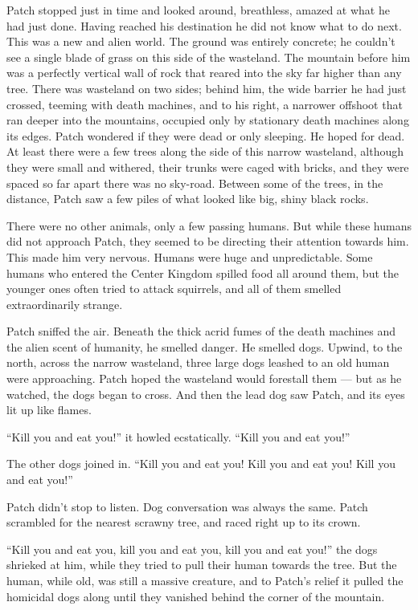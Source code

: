 \documentclass[12pt]{memoir}
\begin{document}
Patch stopped just in time and looked around, breathless, amazed at
what he had just done. Having reached his destination he did not know
what to do next. This was a new and alien world. The ground was
entirely concrete; he couldn’t see a single blade of grass on this
side of the wasteland. The mountain before him was a perfectly
vertical wall of rock that reared into the sky far higher than any
tree. There was wasteland on two sides; behind him, the wide barrier
he had just crossed, teeming with death machines, and to his right, a
narrower offshoot that ran deeper into the mountains, occupied only by
stationary death machines along its edges. Patch wondered if they were
dead or only sleeping. He hoped for dead. At least there were a few
trees along the side of this narrow wasteland, although they were
small and withered, their trunks were caged with bricks, and they were
spaced so far apart there was no sky-road. Between some of the trees,
in the distance, Patch saw a few piles of what looked like big, shiny
black rocks.

There were no other animals, only a few passing humans. But while
these humans did not approach Patch, they seemed to be directing their
attention towards him. This made him very nervous. Humans were huge
and unpredictable. Some humans who entered the Center Kingdom spilled
food all around them, but the younger ones often tried to attack
squirrels, and all of them smelled extraordinarily strange.

Patch sniffed the air. Beneath the thick acrid fumes of the death
machines and the alien scent of humanity, he smelled danger. He
smelled dogs. Upwind, to the north, across the narrow wasteland, three
large dogs leashed to an old human were approaching. Patch hoped the
wasteland would forestall them — but as he watched, the dogs began to
cross. And then the lead dog saw Patch, and its eyes lit up like
flames.

“Kill you and eat you!” it howled ecstatically. “Kill you and eat
you!”

The other dogs joined in. “Kill you and eat you! Kill you and eat you!
Kill you and eat you!”

Patch didn’t stop to listen. Dog conversation was always the
same. Patch scrambled for the nearest scrawny tree, and raced right up
to its crown.

“Kill you and eat you, kill you and eat you, kill you and eat you!”
the dogs shrieked at him, while they tried to pull their human towards
the tree. But the human, while old, was still a massive creature, and
to Patch’s relief it pulled the homicidal dogs along until they
vanished behind the corner of the mountain.
\end{document}
